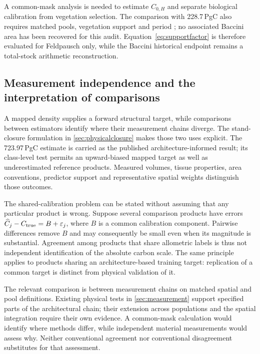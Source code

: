 \documentclass[11pt,a4paper]{article}
\theoremstyle{remark}
\begin{document}
A common-mask analysis is needed to estimate $C_{0,H}$ and separate biological calibration from vegetation selection. The comparison with 228.7\,PgC also requires matched pools, vegetation support and period \citep{Baccini2012}; no associated Baccini area has been recovered for this audit. Equation~\eqref{eq:supportfactor} is therefore evaluated for Feldpausch only, while the Baccini historical endpoint remains a total-stock arithmetic reconstruction.

\subsection{Measurement independence and the interpretation of comparisons}
A mapped density supplies a forward structural target, while comparisons between estimators identify where their measurement chains diverge. The stand-closure formulation in \cref{sec:physicalclosure} makes those two uses explicit. The 723.97\,PgC estimate is carried as the published architecture-informed result; its class-level test permits an upward-biased mapped target as well as underestimated reference products. Measured volumes, tissue properties, area conventions, predictor support and representative spatial weights distinguish those outcomes.

The shared-calibration problem can be stated without assuming that any particular product is wrong. Suppose several comparison products have errors $\widehat C_j-C_{\rm true}=B+\varepsilon_j$, where $B$ is a common calibration component. Pairwise differences remove $B$ and may consequently be small even when its magnitude is substantial. Agreement among products that share allometric labels is thus not independent identification of the absolute carbon scale. The same principle applies to products sharing an architecture-based training target: replication of a common target is distinct from physical validation of it.

The relevant comparison is between measurement chains on matched spatial and pool definitions. Existing physical tests in \cref{sec:measurement} support specified parts of the architectural chain; their extension across populations and the spatial integration require their own evidence. A common-mask calculation would identify where methods differ, while independent material measurements would assess why. Neither conventional agreement nor conventional disagreement substitutes for that assessment.
\end{document}
